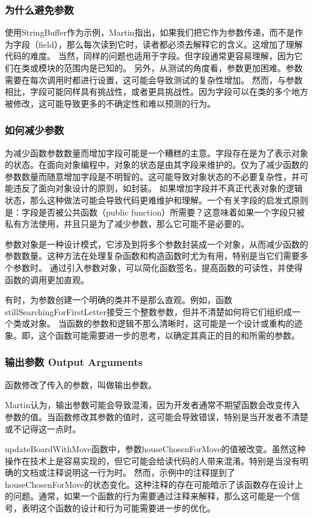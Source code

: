 \documentclass[]{ctexbook}
\begin{document}
\subsubsection{为什么避免参数}

使用StringBuffer作为示例，Martin指出，如果我们把它作为参数传递，而不是作为字段（field），那么每次读到它时，读者都必须去解释它的含义。这增加了理解代码的难度。
当然，同样的问题也适用于字段。但字段通常更容易理解，因为它们在类或模块的范围内是已知的。
另外，从测试的角度看，参数更加困难。参数需要在每次调用时都进行设置，这可能会导致测试的复杂性增加。
然而，与参数相比，字段可能同样具有挑战性，或者更具挑战性。因为字段可以在类的多个地方被修改，这可能导致更多的不确定性和难以预测的行为。

\subsubsection{如何减少参数}
为减少函数参数数量而增加字段可能是一个糟糕的主意。字段存在是为了表示对象的状态。在面向对象编程中，对象的状态是由其字段来维护的。仅为了减少函数的参数数量而随意增加字段是不明智的。这可能导致对象状态的不必要复杂性，并可能违反了面向对象设计的原则，如封装。
如果增加字段并不真正代表对象的逻辑状态，那么这种做法可能会导致代码更难维护和理解。一个有关字段的启发式原则是：字段是否被公共函数（public function）所需要？这意味着如果一个字段只被私有方法使用，并且只是为了减少参数，那么它可能不是必要的。

参数对象是一种设计模式，它涉及到将多个参数封装成一个对象，从而减少函数的参数数量。这种方法在处理复杂函数和构造函数时尤为有用，特别是当它们需要多个参数时。
通过引入参数对象，可以简化函数签名，提高函数的可读性，并使得函数的调用更加直观。

有时，为参数创建一个明确的类并不是那么直观。例如，函数stillSearchingForFirstLetter接受三个整数参数，但并不清楚如何将它们组织成一个类或对象。
当函数的参数和逻辑不那么清晰时，这可能是一个设计或重构的迹象。即，这个函数可能需要进一步的思考，以确定其真正的目的和所需的参数。

\subsubsection{输出参数 Output Arguments}

函数修改了传入的参数，叫做输出参数。

Martin认为，输出参数可能会导致混淆，因为开发者通常不期望函数会改变传入参数的值。当函数修改其参数的值时，这可能会导致错误，特别是当开发者不清楚或不记得这一点时。

updateBoardWithMove函数中，参数houseChosenForMove的值被改变。虽然这种操作在技术上是容易实现的，但它可能会给读代码的人带来混淆。特别是当没有明确的文档或注释说明这一行为时。
然而，示例中的注释提到了houseChosenForMove的状态变化。这种注释的存在可能暗示了该函数存在设计上的问题。通常，如果一个函数的行为需要通过注释来解释，那么这可能是一个信号，表明这个函数的设计和行为可能需要进一步的优化。
\end{document}
